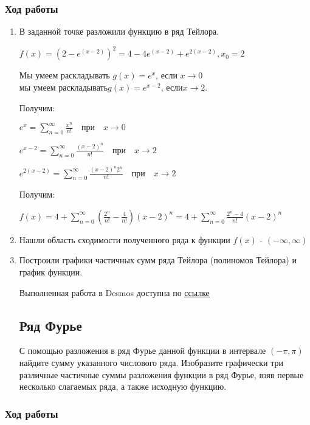 \documentclass{article}
\begin{document}
\subsubsection*{Ход работы}

\begin{enumerate}
    \item В заданной точке разложили  функцию в ряд Тейлора.
	
    $f(x) = (2 - e^{(x-2)})^2 = 4 - 4e^{(x-2)} + e^{2(x-2)}, x_0 = 2$

    Мы умеем раскладывать $g(x) = e^{x}$, если $x\to0$ \Rightarrow $\text{мы умеем раскладывать} g(x) = e^{x-2}\text{, если} x \to 2$.

    Получим:

    $e^{x} =\sum_{n=0}^{\infty} \frac{x^n}{n!} \quad \text{при} \quad x \to 0$

    $e^{x-2} =        \sum_{n=0}^{\infty} \frac{(x-2)^n}{n!} \quad \text{при} \quad x \to 2$

    $e^{2(x-2)} =        \sum_{n=0}^{\infty} \frac{(x-2)^n2^{n}}{n!} \quad \text{при} \quad x \to 2$

    Получим:

    $f(x) = 4 + \sum_{n=0}^{\infty}(\frac{2^{n}}{n!} - \frac{4}{n!})(x-2)^{n} = 4 + \sum_{n=0}^{\infty}\frac{2^{n}-4}{n!}(x-2)^{n}$
    
    \item Нашли область сходимости полученного ряда к функции $f(x)$ - $(-\infty, \infty)$
    \item Построили графики частичных сумм ряда Тейлора (полиномов Тейлора) и график функции.

    Выполненная работа в Desmos доступна по 
\href{https://www.desmos.com/calculator/0imxfkpgnf?lang=ru}{ссылке}

\subsection{Ряд Фурье}
С помощью разложения в ряд Фурье данной функции в интервале $(-\pi, \pi)$ найдите сумму указанного числового ряда. Изобразите графически три различные частичные суммы разложения функции в ряд Фурье, взяв первые несколько слагаемых ряда, а также исходную функцию.

\end{enumerate}

\subsubsection*{Ход работы}
\end{document}
